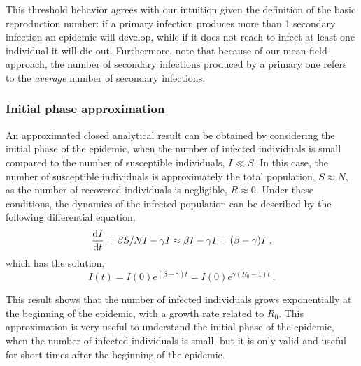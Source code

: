 
This threshold behavior agrees with our intuition given the definition of
the basic reproduction number: if a primary infection produces more than 1
secondary infection an epidemic will develop, while if it does not reach to
infect at least one individual it will die out. Furthermore, note that
because of our mean field approach, the number of secondary infections produced
by a primary one refers to the \textit{average} number of secondary
infections.

\subsubsection*{Initial phase approximation}

An approximated closed analytical result can be obtained by considering the
initial phase of the epidemic, when the number of infected individuals is small
compared to the number of susceptible individuals, $I\ll S$. In this case, the
number of susceptible individuals is approximately the total population,
$S\approx N$, as the number of recovered individuals is negligible,
$R\approx0$. Under these conditions, the dynamics of the infected population
can be described by the following differential equation,
\begin{equation}
  \frac{\mathrm{d} I}{\mathrm{d} t}=\beta S/N I-\gamma I\approx\beta I-\gamma I=(\beta-\gamma)I \ ,
\end{equation}
which has the solution,
\begin{equation}
  I(t)=I(0)e^{(\beta-\gamma)t}=I(0)e^{\gamma(R_0-1)t} \ .
\end{equation}

This result shows that the number of infected individuals grows exponentially
at the beginning of the epidemic, with a growth rate related to $R_0$.
This approximation is very useful to understand the initial phase of the
epidemic, when the number of infected individuals is small, but it is only
valid and useful for short times after the beginning of the epidemic.

